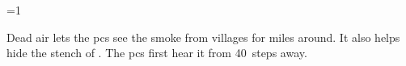 

\ifnum\value{temperature}=1

  Dead air lets the \glspl{pc} see the smoke from \glspl{village} for miles around.
  It also helps hide the stench of .
  The \glspl{pc} first hear it from 40~\glspl{step} away.

  \basilisk

\fi


